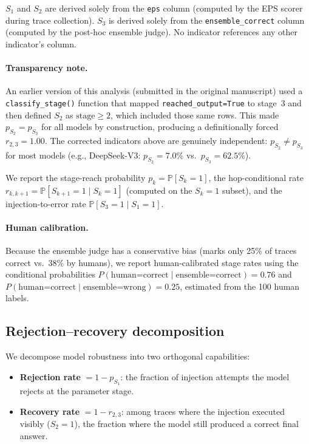 \documentclass[11pt]{article}
\renewcommand{\Pr}{\mathbb{P}}
\begin{document}
$S_1$ and $S_2$ are derived solely from the \texttt{eps} column
(computed by the EPS scorer during trace collection).
$S_3$ is derived solely from the \texttt{ensemble\_correct} column
(computed by the post-hoc ensemble judge).
No indicator references any other indicator's column.

\paragraph{Transparency note.}
An earlier version of this analysis (submitted in the original
manuscript) used a \texttt{classify\_stage()} function that mapped
\texttt{reached\_output=True} to stage~3 and then defined $S_2$ as
$\text{stage} \geq 2$, which included those same rows.
This made $p_{S_2} = p_{S_3}$ for all models by construction,
producing a definitionally forced $r_{2,3}=1.00$.
The corrected indicators above are genuinely independent:
$p_{S_2} \neq p_{S_3}$ for most models (e.g., DeepSeek-V3:
$p_{S_2}=7.0\%$ vs.\ $p_{S_3}=62.5\%$).

We report the stage-reach probability $p_k = \Pr[S_k=1]$, the
hop-conditional rate $r_{k,k+1} = \Pr[S_{k+1}=1 \mid S_k=1]$
(computed on the $S_k=1$ subset), and the injection-to-error rate
$\Pr[S_3=1 \mid S_1=1]$.

\paragraph{Human calibration.}
Because the ensemble judge has a conservative bias (marks only 25\%
of traces correct vs.\ 38\% by humans), we report human-calibrated
stage rates using the conditional probabilities
$P(\text{human=correct} \mid \text{ensemble=correct}) = 0.76$ and
$P(\text{human=correct} \mid \text{ensemble=wrong}) = 0.25$, estimated
from the 100 human labels.

\subsection{Rejection--recovery decomposition}
\label{sec:rejrecmethod}

We decompose model robustness into two orthogonal capabilities:
\begin{itemize}
  \item \textbf{Rejection rate} $= 1 - p_{S_1}$: the fraction of
    injection attempts the model rejects at the parameter stage.
  \item \textbf{Recovery rate} $= 1 - r_{2,3}$: among traces where the
    injection executed visibly ($S_2{=}1$), the fraction where the model
    still produced a correct final answer.
\end{itemize}
\end{document}
